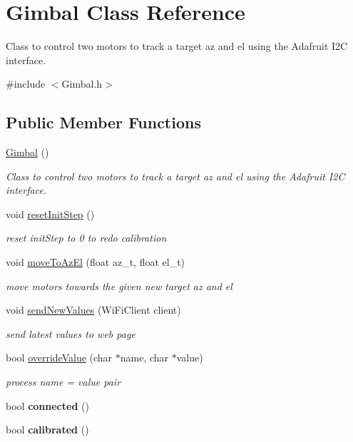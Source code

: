 \hypertarget{class_gimbal}{}\section{Gimbal Class Reference}
\label{class_gimbal}


Class to control two motors to track a target az and el using the Adafruit I2C interface.  




{\ttfamily \#include $<$Gimbal.\+h$>$}

\subsection*{Public Member Functions}
\begin{DoxyCompactItemize}
\item 
\hyperlink{class_gimbal_a5e932498d088171ef32a3b6e2bc03cfc}{Gimbal} ()
\begin{DoxyCompactList}\small\item\em Class to control two motors to track a target az and el using the Adafruit I2C interface. \end{DoxyCompactList}\item 
\mbox{\label{class_gimbal_a2444c7e2b066061dfa28437114f076c1}} 
void \hyperlink{class_gimbal_a2444c7e2b066061dfa28437114f076c1}{reset\+Init\+Step} ()
\begin{DoxyCompactList}\small\item\em reset init\+Step to 0 to redo calibration \end{DoxyCompactList}\item 
void \hyperlink{class_gimbal_a391c53aaaa9fb6ec8547d87c3cc09933}{move\+To\+Az\+El} (float az\+\_\+t, float el\+\_\+t)
\begin{DoxyCompactList}\small\item\em move motors towards the given new target az and el \end{DoxyCompactList}\item 
void \hyperlink{class_gimbal_ab77d72c96b391e64b6c08bb3fa6c7f49}{send\+New\+Values} (Wi\+Fi\+Client client)
\begin{DoxyCompactList}\small\item\em send latest values to web page \end{DoxyCompactList}\item 
bool \hyperlink{class_gimbal_a121d20adcddc320e78d5aa391189d0b6}{override\+Value} (char $\ast$name, char $\ast$value)
\begin{DoxyCompactList}\small\item\em process name = value pair \end{DoxyCompactList}\item 
\mbox{\label{class_gimbal_a7259c5e491f330fed6d2aaafc955cd86}} 
bool {\bfseries connected} ()
\item 
\mbox{\label{class_gimbal_ab16f668ecf67eb27d471a2e4a687c0ed}} 
bool {\bfseries calibrated} ()
\end{DoxyCompactItemize}


